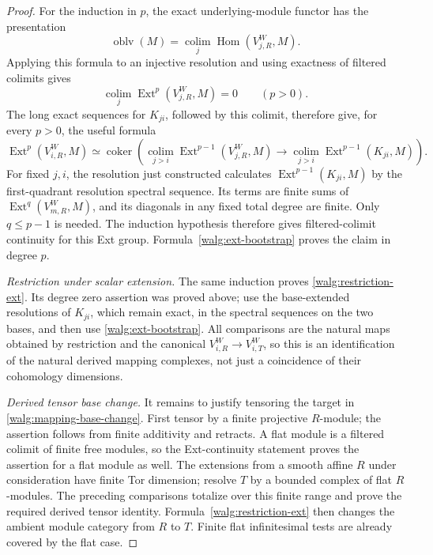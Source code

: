 \begin{proof}
For the induction in \(p\), the exact underlying-module functor has
the presentation
\[
 \operatorname{oblv}(M)=
 \underset{j}{\operatorname{colim}}
       \operatorname{Hom}(V_{j,R}^W,M).
\]
Applying this formula to an injective resolution and using exactness
of filtered colimits gives
\[
 \underset{j}{\operatorname{colim}}
       \operatorname{Ext}^p(V_{j,R}^W,M)=0\qquad(p>0).
\]
The long exact sequences for \(K_{ji}\), followed by this colimit,
therefore give, for every \(p>0\), the useful formula
\begin{equation}\label{walg:ext-bootstrap}
 \operatorname{Ext}^p(V_{i,R}^W,M)
 \simeq\operatorname{coker}\left(
 \underset{j>i}{\operatorname{colim}}
       \operatorname{Ext}^{p-1}(V_{j,R}^W,M)
 \longrightarrow
 \underset{j>i}{\operatorname{colim}}
       \operatorname{Ext}^{p-1}(K_{ji},M)\right).
\end{equation}
For fixed \(j,i\), the resolution just constructed calculates
\(\operatorname{Ext}^{p-1}(K_{ji},M)\) by the first-quadrant
resolution spectral sequence.  Its terms are finite sums of
\(\operatorname{Ext}^q(V_{m,R}^W,M)\), and its diagonals in any
fixed total degree are finite.  Only \(q\leq p-1\) is needed.
The induction hypothesis therefore gives filtered-colimit continuity
for this Ext group.  Formula~\eqref{walg:ext-bootstrap} proves the
claim in degree \(p\).

\smallskip
\noindent\emph{Restriction under scalar extension.}
The same induction proves \eqref{walg:restriction-ext}.  Its degree
zero assertion was proved above; use the base-extended resolutions
of \(K_{ji}\), which remain exact, in the spectral sequences on the
two bases, and then use \eqref{walg:ext-bootstrap}.  All comparisons
are the natural maps obtained by restriction and the canonical
\(V_{i,R}^W\to V_{i,T}^W\), so this is an identification of the
natural derived mapping complexes, not just a coincidence of their
cohomology dimensions.

\smallskip
\noindent\emph{Derived tensor base change.}
It remains to justify tensoring the target in
\eqref{walg:mapping-base-change}.  First tensor by a finite projective
\(R\)-module; the assertion follows from finite additivity and
retracts.  A flat module is a filtered colimit of finite free modules,
so the Ext-continuity statement proves the assertion for a flat
module as well.  The extensions from a smooth affine \(R\) under
consideration have finite Tor dimension; resolve \(T\) by a bounded
complex of flat \(R\)-modules.  The preceding comparisons totalize
over this finite range and prove the required derived tensor
identity.  Formula~\eqref{walg:restriction-ext} then changes the
ambient module category from \(R\) to \(T\).  Finite flat
infinitesimal tests are already covered by the flat case.
\end{proof}

